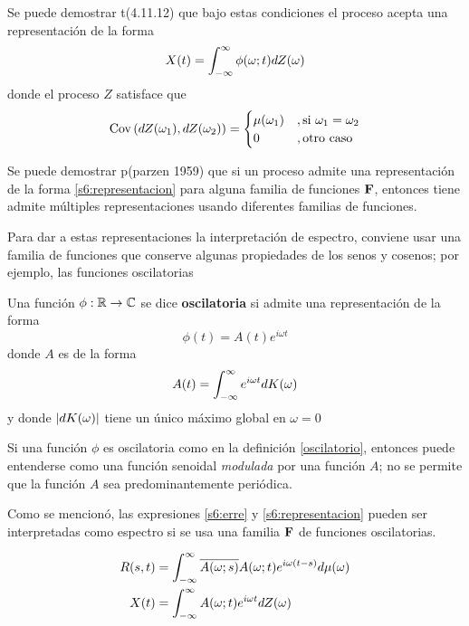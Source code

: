 Se puede demostrar t(4.11.12) que bajo estas condiciones el proceso \xt acepta una representación de la forma 
\begin{equation}
X(t) = \int_{-\infty}^{\infty} \phi(\omega;t) dZ(\omega)
\label{s6:representacion}
\end{equation}
donde el proceso $Z$ satisface que
\begin{equation}
\mathrm{Cov}\left( dZ(\omega_1),dZ(\omega_2) \right) = 
\begin{cases}
\mu(\omega_1) &, \text{si } \omega_1 = \omega_2 \\
0 &, \text{otro caso}
\end{cases}
\end{equation}


Se puede demostrar p(parzen 1959) que si un proceso admite una representación de la forma \ref{s6:representacion} para alguna familia de funciones $\mathbf{F}$, entonces tiene admite múltiples
representaciones usando diferentes familias de funciones.
%
%

Para dar a estas representaciones la interpretación de espectro, conviene usar una familia de funciones que conserve algunas propiedades de los senos y cosenos; por ejemplo, las funciones oscilatorias

\begin{definicion}
Una función $\phi: \mathbb{R} \rightarrow \mathbb{C}$ se dice \textbf{oscilatoria} si admite una representación de la forma
\begin{equation}
\phi(t) = A(t) e^{i \omega t} 
\end{equation}
donde $A$ es de la forma
\begin{equation}
A(t) = \int_{-\infty}^{\infty} e^{i \omega t} dK(\omega)
\end{equation}
y donde $\left| dK(\omega) \right|$ tiene un único máximo global en $\omega = 0$
\label{oscilatorio}
\end{definicion}

Si una función $\phi$ es oscilatoria como en la definición \ref{oscilatorio}, entonces puede entenderse como una función senoidal \textit{modulada} por una función $A$; no se permite que la función $A$ sea predominantemente periódica.

Como se mencionó, las expresiones \ref{s6:erre} y \ref{s6:representacion} pueden ser interpretadas como espectro si se usa una familia $\mathbf{F}$ de funciones oscilatorias.

\begin{align}
R(s,t) &= \int_{-\infty}^{\infty} \overline{A(\omega; s)} A(\omega; t) e^{i\omega (t-s)} d\mu(\omega) \\
X(t) &= \int_{-\infty}^{\infty} A(\omega; t) e^{i \omega t} dZ(\omega)
\end{align}


